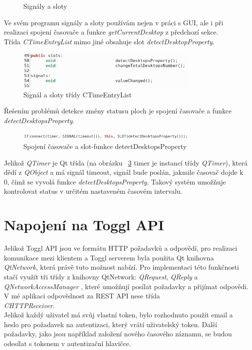 \documentclass[thesis=B,czech]{FITthesis}[2012/06/26]
\begin{document}
\begin{description}
\begin{figure}[H]
	\caption[Signály a sloty]{Signály a sloty}\label{fig:qt_doc_ss}
\end{figure}
\newpage
Ve svém programu signály a sloty používám nejen v práci s GUI, ale i při realizaci spojení časovače a funkce \textit{getCurrentDesktop} z předchozí sekce. \\
Třída \textit{CTimeEntryList} mimo jiné obsahuje  slot \textit{detectDesktopProperty}. 
 \begin{figure}[H]\centering
	\includegraphics[width=0.8\textwidth]{sig_slot.png}
	\caption[Signál a sloty třídy CTimeEntryList]{Signál a sloty třídy CTimeEntryList}\label{fig:sig_slot}
\end{figure}
Řešením problémů detekce změny statusu ploch je spojení časovače a funkce \textit{detectDesktopsProperty}.
 \begin{figure}[H]\centering
	\includegraphics[width=0.8\textwidth]{connect.png}
	\caption[Spojení časovače a slot-funkce detectDesktopsProperty]{Spojení časovače a slot-funkce detectDesktopsProperty}\label{fig:connect}
\end{figure}
Jelikož \textit{QTimer} je Qt třída (na obrázku ~\ref{fig:connect} timer je instancí třídy \textit{QTimer}), která dědí z \textit{QObject} a má signál timeout, signál bude poslán, jakmile časovač dojde k 0, čímž se vyvolá funkce \textit{detectDesktopsProperty}. Takový systém umožňuje
kontrolovat status v určitém nastaveném časovém intervalu. 


\end{description}

\section{Napojení na Toggl API}

Jelikož Toggl API jsou ve formátu HTTP požadavků a odpovědí, pro realizaci komunikace mezi klientem a Toggl serverem byla použita Qt knihovna \mbox{\textit{QtNetwork}}, která právě tuto možnost nabízí. Pro implementaci této funkčnosti stačí využít tři třídy z knihovny QtNetwork: \textit{QRequest}, \textit{QReply} a \\ \mbox{\textit{QNetworkAccessManager}} \cite{qt_netw}, které umožňují posílat požadavky a přijímat odpovědi. V mé aplikaci odpovědnost za REST API nese třída \\ \mbox{\textit{CHTTPReceiver}}. \\
Jelikož každý uživatel má svůj vlastní token, bylo rozhodnuto použít email a heslo pro požadavek na autentizaci, který vrátí uživatelský token. Další požadavky, jako jsou například založení nového časového záznamu, se budou odesílat s tokenem v autentizační hlavičce. 
\end{document}
